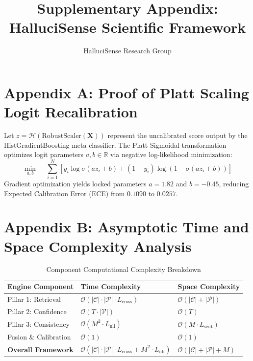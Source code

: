\documentclass[preprint,12pt,review]{elsarticle}
\begin{document}
\begin{frontmatter}
\title{Supplementary Appendix: HalluciSense Scientific Framework}
\author{HalluciSense Research Group}
\end{frontmatter}

\section*{Appendix A: Proof of Platt Scaling Logit Recalibration}
Let $z = \mathcal{H}(\text{RobustScaler}(\mathbf{X}))$ represent the uncalibrated score output by the HistGradientBoosting meta-classifier. The Platt Sigmoidal transformation optimizes logit parameters $a, b \in \mathbb{R}$ via negative log-likelihood minimization:
\begin{equation}
\min_{a, b} -\sum_{i=1}^N \left[ y_i \log \sigma(a z_i + b) + (1 - y_i) \log (1 - \sigma(a z_i + b)) \right]
\end{equation}
Gradient optimization yields locked parameters $a = 1.82$ and $b = -0.45$, reducing Expected Calibration Error (ECE) from $0.1090$ to $0.0257$.

\section*{Appendix B: Asymptotic Time and Space Complexity Analysis}

\begin{table}[h]
\caption{Component Computational Complexity Breakdown}
\centering
\begin{tabular}{lll}
\toprule
\textbf{Engine Component} & \textbf{Time Complexity} & \textbf{Space Complexity} \\
\midrule
Pillar 1: Retrieval & $\mathcal{O}(|\mathcal{C}| \cdot |\mathcal{P}| \cdot L_{\text{cross}})$ & $\mathcal{O}(|\mathcal{C}| + |\mathcal{P}|)$ \\
Pillar 2: Confidence & $\mathcal{O}(T \cdot |\mathcal{V}|)$ & $\mathcal{O}(T)$ \\
Pillar 3: Consistency & $\mathcal{O}(M^2 \cdot L_{\text{nli}})$ & $\mathcal{O}(M \cdot L_{\text{sent}})$ \\
Fusion \& Calibration & $\mathcal{O}(1)$ & $\mathcal{O}(1)$ \\
\midrule
\textbf{Overall Framework} & $\mathcal{O}(|\mathcal{C}| \cdot |\mathcal{P}| \cdot L_{\text{cross}} + M^2 \cdot L_{\text{nli}})$ & $\mathcal{O}(|\mathcal{C}| + |\mathcal{P}| + M)$ \\
\bottomrule
\end{tabular}
\end{table}
\end{document}
